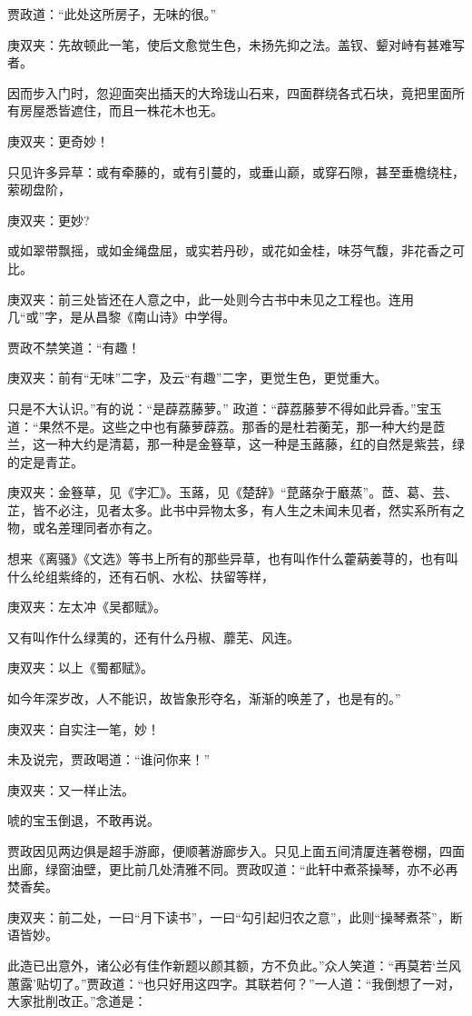 \begin{parag}
    贾政道：“此处这所房子，无味的很。”\begin{note}庚双夹：先故顿此一笔，使后文愈觉生色，未扬先抑之法。盖钗、颦对峙有甚难写者。\end{note}因而步入门时，忽迎面突出插天的大玲珑山石来，四面群绕各式石块，竟把里面所有房屋悉皆遮住，而且一株花木也无。\begin{note}庚双夹：更奇妙！\end{note}只见许多异草：或有牵藤的，或有引蔓的，或垂山巅，或穿石隙，甚至垂檐绕柱，萦砌盘阶，\begin{note}庚双夹：更妙?\end{note}或如翠带飘摇，或如金绳盘屈，或实若丹砂，或花如金桂，味芬气馥，非花香之可比。\begin{note}庚双夹：前三处皆还在人意之中，此一处则今古书中未见之工程也。连用几“或”字，是从昌黎《南山诗》中学得。\end{note}贾政不禁笑道：“有趣！\begin{note}庚双夹：前有“无味”二字，及云“有趣”二字，更觉生色，更觉重大。\end{note}只是不大认识。”有的说：“是薜荔藤萝。” 政道：“薜荔藤萝不得如此异香。”宝玉道：“果然不是。这些之中也有藤萝薜荔。那香的是杜若蘅芜，那一种大约是茝兰，这一种大约是清葛，那一种是金簦草，这一种是玉蕗藤，红的自然是紫芸，绿的定是青芷。\begin{note}庚双夹：金簦草，见《字汇》。玉蕗，见《楚辞》“菎蕗杂于黀蒸”。茝、葛、芸、芷，皆不必注，见者太多。此书中异物太多，有人生之未闻未见者，然实系所有之物，或名差理同者亦有之。\end{note}想来《离骚》《文选》等书上所有的那些异草，也有叫作什么藿蒳姜荨的，也有叫什么纶组紫绛的，还有石帆、水松、扶留等样，\begin{note}庚双夹：左太冲《吴都赋》。\end{note}又有叫作什么绿荑的，还有什么丹椒、蘼芜、风连。\begin{note}庚双夹：以上《蜀都赋》。\end{note}如今年深岁改，人不能识，故皆象形夺名，渐渐的唤差了，也是有的。”\begin{note}庚双夹：自实注一笔，妙！\end{note}未及说完，贾政喝道：“谁问你来！”\begin{note}庚双夹：又一样止法。\end{note}唬的宝玉倒退，不敢再说。
\end{parag}


\begin{parag}
    贾政因见两边俱是超手游廊，便顺著游廊步入。只见上面五间清厦连著卷棚，四面出廊，绿窗油壁，更比前几处清雅不同。贾政叹道：“此轩中煮茶操琴，亦不必再焚香矣。\begin{note}庚双夹：前二处，一曰“月下读书”，一曰“勾引起归农之意”，此则“操琴煮茶”，断语皆妙。\end{note}此造已出意外，诸公必有佳作新题以颜其额，方不负此。”众人笑道：“再莫若‘兰风蕙露’贴切了。”贾政道：“也只好用这四字。其联若何？”一人道：“我倒想了一对，大家批削改正。”念道是：
\end{parag}


